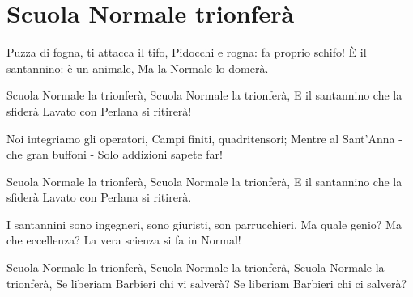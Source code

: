\section{Scuola Normale trionferà}
\subtitle{Sulla melodia di “Bandiera Rossa”}

\subtitle{Tonalità possibilmente bassa}
\begin{canzone}
Puzza di fogna, ti attacca il tifo,
Pidocchi e rogna: fa proprio schifo!
È il santannino: è un animale,
Ma la Normale lo domerà.

Scuola Normale la trionferà,
Scuola Normale la trionferà,
E il santannino che la sfiderà
Lavato con Perlana si ritirerà!

Noi integriamo gli operatori,
Campi finiti, quadritensori;
Mentre al Sant’Anna - che gran buffoni - 
Solo addizioni sapete far!

Scuola Normale la trionferà,
Scuola Normale la trionferà,
E il santannino che la sfiderà
Lavato con Perlana si ritirerà.

I santannini sono ingegneri,
sono giuristi, son parrucchieri.
Ma quale genio? Ma che eccellenza?
La vera scienza si fa in Normal!

Scuola Normale la trionferà,
Scuola Normale la trionferà,
Scuola Normale la trionferà,
Se liberiam Barbieri chi vi salverà?
Se liberiam Barbieri chi ci salverà?
\end{canzone}
